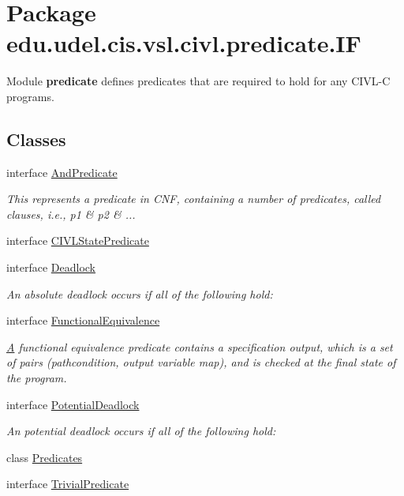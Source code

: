 \hypertarget{namespaceedu_1_1udel_1_1cis_1_1vsl_1_1civl_1_1predicate_1_1IF}{}\section{Package edu.\+udel.\+cis.\+vsl.\+civl.\+predicate.\+I\+F}
\label{namespaceedu_1_1udel_1_1cis_1_1vsl_1_1civl_1_1predicate_1_1IF}


Module {\bfseries predicate} defines predicates that are required to hold for any C\+I\+V\+L-\/\+C programs.  


\subsection*{Classes}
\begin{DoxyCompactItemize}
\item 
interface \hyperlink{interfaceedu_1_1udel_1_1cis_1_1vsl_1_1civl_1_1predicate_1_1IF_1_1AndPredicate}{And\+Predicate}
\begin{DoxyCompactList}\small\item\em This represents a predicate in C\+N\+F, containing a number of predicates, called clauses, i.\+e., p1 \& p2 \& ... \end{DoxyCompactList}\item 
interface \hyperlink{interfaceedu_1_1udel_1_1cis_1_1vsl_1_1civl_1_1predicate_1_1IF_1_1CIVLStatePredicate}{C\+I\+V\+L\+State\+Predicate}
\item 
interface \hyperlink{interfaceedu_1_1udel_1_1cis_1_1vsl_1_1civl_1_1predicate_1_1IF_1_1Deadlock}{Deadlock}
\begin{DoxyCompactList}\small\item\em An absolute deadlock occurs if all of the following hold\+: \end{DoxyCompactList}\item 
interface \hyperlink{interfaceedu_1_1udel_1_1cis_1_1vsl_1_1civl_1_1predicate_1_1IF_1_1FunctionalEquivalence}{Functional\+Equivalence}
\begin{DoxyCompactList}\small\item\em \hyperlink{structA}{A} functional equivalence predicate contains a specification output, which is a set of pairs (pathcondition, output variable map), and is checked at the final state of the program. \end{DoxyCompactList}\item 
interface \hyperlink{interfaceedu_1_1udel_1_1cis_1_1vsl_1_1civl_1_1predicate_1_1IF_1_1PotentialDeadlock}{Potential\+Deadlock}
\begin{DoxyCompactList}\small\item\em An potential deadlock occurs if all of the following hold\+: \end{DoxyCompactList}\item 
class \hyperlink{classedu_1_1udel_1_1cis_1_1vsl_1_1civl_1_1predicate_1_1IF_1_1Predicates}{Predicates}
\item 
interface \hyperlink{interfaceedu_1_1udel_1_1cis_1_1vsl_1_1civl_1_1predicate_1_1IF_1_1TrivialPredicate}{Trivial\+Predicate}
\end{DoxyCompactItemize}


